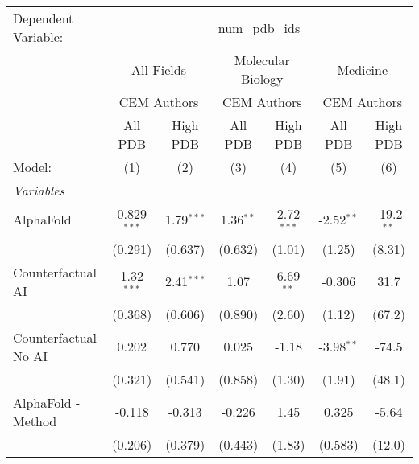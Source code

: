 \begingroup
\centering
\begin{tabular}{lcccccc}
   \tabularnewline \midrule \midrule
   Dependent Variable: & \multicolumn{6}{c}{num\_pdb\_ids}\\
 & \multicolumn{2}{c}{All Fields} & \multicolumn{2}{c}{Molecular Biology} & \multicolumn{2}{c}{Medicine} \\
\cmidrule(lr){2-3} \cmidrule(lr){4-5} \cmidrule(lr){6-7}
 & \multicolumn{2}{c}{CEM Authors} & \multicolumn{2}{c}{CEM Authors} & \multicolumn{2}{c}{CEM Authors} \\
\cmidrule(lr){2-3} \cmidrule(lr){4-5} \cmidrule(lr){6-7}
 & \multicolumn{1}{c}{All PDB} & \multicolumn{1}{c}{High PDB} & \multicolumn{1}{c}{All PDB} & \multicolumn{1}{c}{High PDB} & \multicolumn{1}{c}{All PDB} & \multicolumn{1}{c}{High PDB} \\
\cmidrule(lr){2-2} \cmidrule(lr){3-3} \cmidrule(lr){4-4} \cmidrule(lr){5-5} \cmidrule(lr){6-6} \cmidrule(lr){7-7}
   Model:                                                     & (1)           & (2)           & (3)          & (4)          & (5)           & (6)\\  
   \midrule
   \emph{Variables}\\
   AlphaFold                                                  & 0.829$^{***}$ & 1.79$^{***}$  & 1.36$^{**}$  & 2.72$^{***}$ & -2.52$^{**}$  & -19.2$^{**}$\\   
                                                              & (0.291)       & (0.637)       & (0.632)      & (1.01)       & (1.25)        & (8.31)\\   
   Counterfactual AI                                          & 1.32$^{***}$  & 2.41$^{***}$  & 1.07         & 6.69$^{**}$  & -0.306        & 31.7\\   
                                                              & (0.368)       & (0.606)       & (0.890)      & (2.60)       & (1.12)        & (67.2)\\   
   Counterfactual No AI                                       & 0.202         & 0.770         & 0.025        & -1.18        & -3.98$^{**}$  & -74.5\\   
                                                              & (0.321)       & (0.541)       & (0.858)      & (1.30)       & (1.91)        & (48.1)\\   
   AlphaFold - Method                                         & -0.118        & -0.313        & -0.226       & 1.45         & 0.325         & -5.64\\   
                                                              & (0.206)       & (0.379)       & (0.443)      & (1.83)       & (0.583)       & (12.0)\\   

\end{tabular}

